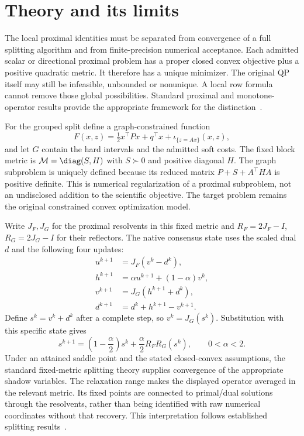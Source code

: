 \section{Theory and its limits}\label{sec:theory}
The local proximal identities must be separated from convergence of a full
splitting algorithm and from finite-precision numerical acceptance. Each
admitted scalar or directional proximal problem has a proper closed convex
objective plus a positive quadratic metric. It therefore has a unique
minimizer. The original QP itself may still be infeasible, unbounded or
nonunique. A local row formula cannot remove those global possibilities.
Standard proximal and monotone-operator results provide the appropriate
framework for the distinction~\cite{prox,rockafellarppa,lions,eckstein}.

For the grouped split define a graph-constrained function
\begin{equation}\label{eq:paper-graph-function}
 F(x,z)=\tfrac12x^\top P x+q^\top x+
            \iota_{\{z=Ax\}}(x,z),
\end{equation}
and let $G$ contain the hard intervals and the admitted soft costs.
The fixed block metric is $\mathcal M=\diag(S,H)$ with $S\succ0$ and
positive diagonal $H$. The graph subproblem is uniquely defined because
its reduced matrix $P+S+A^\top H A$ is positive definite. This is
numerical regularization of a proximal subproblem, not an undisclosed
addition to the scientific objective. The target problem remains the
original constrained convex optimization model.

Write $J_F,J_G$ for the proximal resolvents in this fixed metric and
$R_F=2J_F-I$, $R_G=2J_G-I$ for their reflectors. The native consensus
state uses the scaled dual $d$ and the following four updates:
\begin{align}\label{eq:paper-consensus-updates}
 u^{k+1}&=J_F(v^k-d^k),\\
 h^{k+1}&=\alpha u^{k+1}+(1-\alpha)v^k,\nonumber\\
 v^{k+1}&=J_G(h^{k+1}+d^k),\nonumber\\
 d^{k+1}&=d^k+h^{k+1}-v^{k+1}.\nonumber
\end{align}
Define $s^k=v^k+d^k$ after a complete step, so $v^k=J_G(s^k)$.
Substitution with this specific state gives
\begin{equation}\label{eq:paper-relaxed-dr}
 s^{k+1}=\left(1-\frac\alpha2\right)s^k+
                    \frac\alpha2 R_F R_G(s^k),\qquad0<\alpha<2.
\end{equation}
Under an attained saddle point and the stated closed-convex assumptions,
the standard fixed-metric splitting theory supplies convergence of the
appropriate shadow variables. The relaxation range makes the displayed
operator averaged in the relevant metric. Its fixed points are connected
to primal/dual solutions through the resolvents, rather than being
identified with raw numerical coordinates without that recovery.
This interpretation follows established splitting results~\cite{admm,eckstein}.

